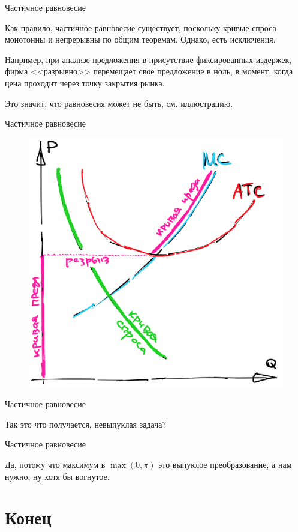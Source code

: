 \documentclass{beamer}
\begin{document}
\begin{frame}{Частичное равновесие}

Как правило, частичное равновесие существует, поскольку кривые спроса монотонны и непрерывны по общим теоремам. Однако, есть исключения. 

Например, при анализе предложения в присутствие фиксированных издержек, фирма <<разрывно>> перемещает свое предложение в ноль, в момент, когда цена проходит через точку закрытия рынка. 

Это значит, что равновесия может не быть, см. иллюстрацию.
	
\end{frame}

\begin{frame}{Частичное равновесие}

\begin{figure}[hbt]
\centering
\includegraphics[width=.7 \textwidth]{nonexistence.png}
\end{figure}
	
\end{frame}

\begin{frame}{Частичное равновесие}

Так это что получается, невыпуклая задача?
	
\end{frame}

\begin{frame}{Частичное равновесие}

Да, потому что максимум в $\max(0, \pi)$ это выпуклое преобразование, а нам нужно, ну хотя бы вогнутое. 
	
\end{frame}

\section{Конец}
\end{document}
